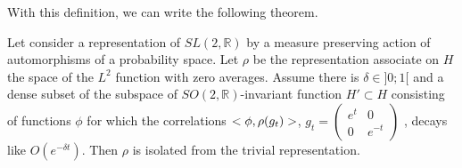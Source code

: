 With this definition, we can write the following theorem.

\begin{prop}
Let consider a representation of $SL(2,\mathbb{R})$ by a measure preserving action of automorphisms of a probability space. Let $\rho$ be the representation associate on $H$ the space of the $L^2$ function with zero averages. Assume there is $\delta \in ]0;1[$ and a dense subset of the subspace of $SO(2,\mathbb{R})$-invariant function $H' \subset H$ consisting of functions $\phi$ for which the correlations $<\phi, \rho(g_t) \time \phi>$, $g_t=\begin{pmatrix} e^t & 0 \\ 0 & e^{-t} \end{pmatrix} $
, decays like $O(e^{- \delta t})$. Then $\rho$ is isolated from the trivial representation.

\end{prop}
